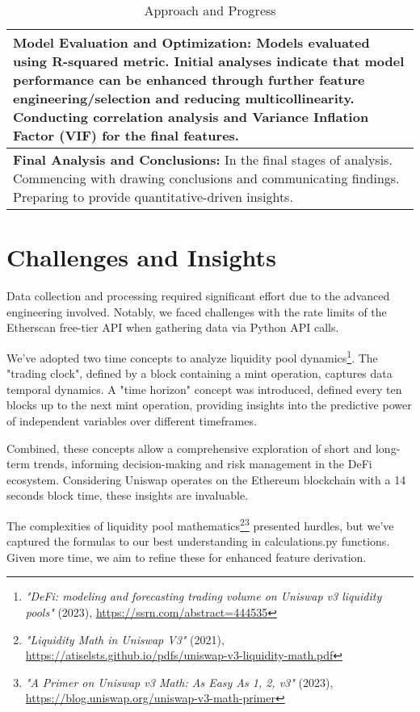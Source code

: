 \documentclass{article}
\begin{document}
{\begin{table}[htbp]
\begin{tabularx}{\linewidth}{|>{\raggedright\arraybackslash}X|}
\hline
\textbf{Model Evaluation and Optimization:} Models evaluated using R-squared metric. Initial analyses indicate that model performance can be enhanced through further feature engineering/selection and reducing multicollinearity. Conducting correlation analysis and Variance Inflation Factor (VIF) for the final features. \\
\hline
\textbf{Final Analysis and Conclusions:} In the final stages of analysis. Commencing with drawing conclusions and communicating findings. Preparing to provide quantitative-driven insights. \\
\hline
\end{tabularx}
\caption{Approach and Progress}
\label{fig:approach-progress}
\end{table}

\vspace{-2em} %
\section*{Challenges and Insights}

Data collection and processing required significant effort due to the advanced engineering involved. Notably, we faced challenges with the rate limits of the Etherscan free-tier API when gathering data via Python API calls.

We've adopted two time concepts to analyze liquidity pool dynamics\footnote{\textit{"DeFi: modeling and forecasting trading volume on Uniswap v3 liquidity pools"} (2023), \url{https://ssrn.com/abstract=444535}}. The "trading clock", defined by a block containing a mint operation, captures data temporal dynamics. A "time horizon" concept was introduced, defined every ten blocks up to the next mint operation, providing insights into the predictive power of independent variables over different timeframes.

Combined, these concepts allow a comprehensive exploration of short and long-term trends, informing decision-making and risk management in the DeFi ecosystem. Considering Uniswap operates on the Ethereum blockchain with a 14 seconds block time, these insights are invaluable.

The complexities of liquidity pool mathematics\footnote{\textit{"Liquidity Math in Uniswap V3"} (2021), \url{https://atiselsts.github.io/pdfs/uniswap-v3-liquidity-math.pdf}}\footnote{\textit{"A Primer on Uniswap v3 Math: As Easy As 1, 2, v3"} (2023), \url{https://blog.uniswap.org/uniswap-v3-math-primer}} presented hurdles, but we've captured the formulas to our best understanding in calculations.py functions. Given more time, we aim to refine these for enhanced feature derivation.


}
\end{document}
